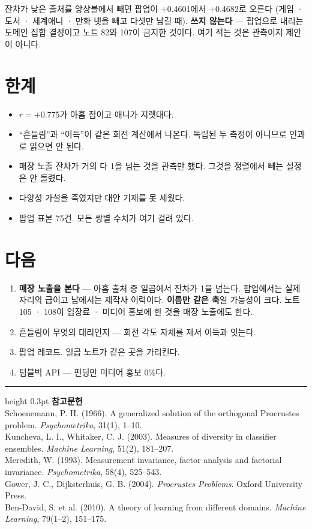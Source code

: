 \documentclass[10pt]{article}
\begin{document}
잔차가 낮은 출처를 앙상블에서 빼면 팝업이 $+$0.4601에서 $+$0.4682로 오른다
(게임 · 도서 · 세계애니 · 만화 넷을 빼고 다섯만 남길 때). \textbf{쓰지
않는다} --- 팝업으로 내리는 도메인 집합 결정이고 노트 82와 107이 금지한
것이다. 여기 적는 것은 관측이지 제안이 아니다.

\section{한계}

\begin{itemize}[leftmargin=1.1em,itemsep=0.15em]
\item $r{=}+$0.775가 아홉 점이고 애니가 지렛대다.
\item ``흔들림''과 ``이득''이 같은 회전 계산에서 나온다. 독립된 두 측정이
      아니므로 인과로 읽으면 안 된다.
\item 매장 노출 잔차가 거의 다 1을 넘는 것을 관측만 했다. 그것을 정렬에서
      빼는 설정은 안 돌렸다.
\item 다양성 가설을 죽였지만 대안 기제를 못 세웠다.
\item 팝업 표본 75건. 모든 쌍별 수치가 여기 걸려 있다.
\end{itemize}

\section{다음}

\begin{enumerate}[leftmargin=1.3em,itemsep=0.15em]
\item \textbf{매장 노출을 본다} --- 아홉 출처 중 일곱에서 잔차가 1을 넘는다.
      팝업에서는 실제 자리의 급이고 남에서는 제작사 이력이다. \textbf{이름만
      같은 축}일 가능성이 크다. 노트 105 · 108이 입장료 · 미디어 홍보에 한
      것을 매장 노출에도 한다.
\item 흔들림이 무엇의 대리인지 --- 회전 각도 자체를 재서 이득과 잇는다.
\item 팝업 레코드. 일곱 노트가 같은 곳을 가리킨다.
\item 텀블벅 API --- 펀딩만 미디어 홍보 0\%다.
\end{enumerate}

\vspace{0.6em}
\hrule height 0.3pt
\vspace{0.5em}
{\footnotesize
\textbf{참고문헌}\\[0.3em]
Schoenemann, P. H. (1966). A generalized solution of the orthogonal Procrustes
problem. \emph{Psychometrika}, 31(1), 1--10.\\[0.15em]
Kuncheva, L. I., Whitaker, C. J. (2003). Measures of diversity in classifier
ensembles. \emph{Machine Learning}, 51(2), 181--207.\\[0.15em]
Meredith, W. (1993). Measurement invariance, factor analysis and factorial
invariance. \emph{Psychometrika}, 58(4), 525--543.\\[0.15em]
Gower, J. C., Dijksterhuis, G. B. (2004). \emph{Procrustes Problems}.
Oxford University Press.\\[0.15em]
Ben-David, S. et al. (2010). A theory of learning from different domains.
\emph{Machine Learning}, 79(1--2), 151--175.
}
\end{document}
